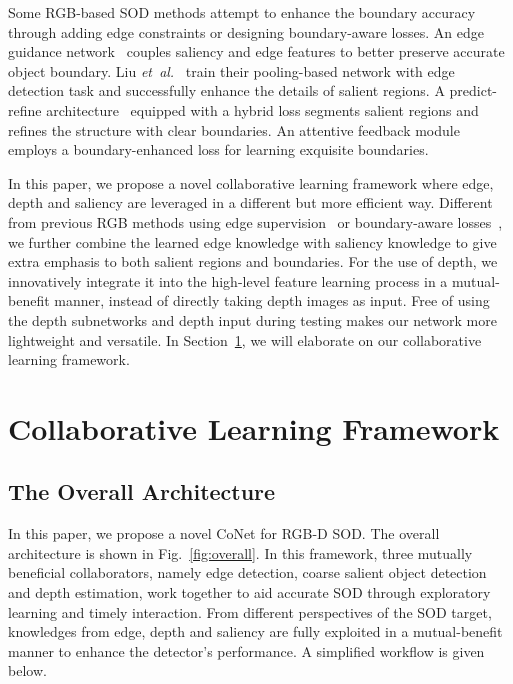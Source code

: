 \documentclass[runningheads]{llncs}
\begin{document}
Some RGB-based SOD methods attempt to enhance the boundary accuracy through adding edge constraints or designing boundary-aware losses.
An edge guidance network~\cite{2DEGNet} couples saliency and edge features to better preserve accurate object boundary.
Liu \emph{et~al.}~\cite{2DPoolNet} train their pooling-based network with edge detection task and successfully enhance the details of salient regions.
A predict-refine architecture~\cite{2DBASNet} equipped with a hybrid loss segments salient regions and refines the structure with clear boundaries.
An attentive feedback module~\cite{2DAFNet} employs a boundary-enhanced loss for learning exquisite boundaries.

In this paper, we propose a novel collaborative learning framework where edge, depth and saliency are leveraged in a different but more efficient way.
Different from previous RGB methods using edge supervision~\cite{2DEGNet,2DPoolNet} or boundary-aware losses~\cite{2DBASNet,2DAFNet}, we further combine the learned edge knowledge with saliency knowledge to give extra emphasis to both salient regions and boundaries.
For the use of depth, we innovatively integrate it into the high-level feature learning process in a mutual-benefit manner, instead of directly taking depth images as input.
Free of using the depth subnetworks and depth input during testing makes our network more lightweight and versatile.
In Section~\ref{section:3}, we will elaborate on our collaborative learning framework.


\section{Collaborative Learning Framework}
\label{section:3}

\subsection{The Overall Architecture}



In this paper, we propose a novel CoNet for RGB-D SOD.
The overall architecture is shown in Fig.~\ref{fig:overall}.
In this framework, three mutually beneficial collaborators, namely edge detection, coarse salient object detection and depth estimation, work together to aid accurate SOD through exploratory learning and timely interaction.
From different perspectives of the SOD target, knowledges from edge, depth and saliency are fully exploited in a mutual-benefit manner to enhance the detector's performance.
A simplified workflow is given below.
\end{document}

